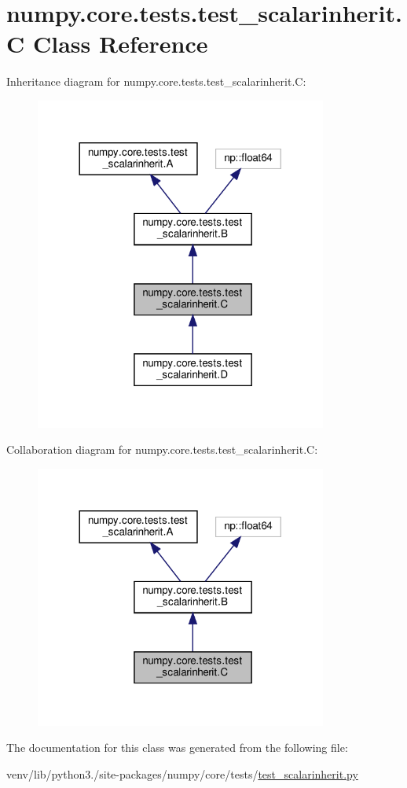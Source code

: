 \hypertarget{classnumpy_1_1core_1_1tests_1_1test__scalarinherit_1_1C}{}\section{numpy.\+core.\+tests.\+test\+\_\+scalarinherit.\+C Class Reference}
\label{classnumpy_1_1core_1_1tests_1_1test__scalarinherit_1_1C}


Inheritance diagram for numpy.\+core.\+tests.\+test\+\_\+scalarinherit.\+C\+:
\nopagebreak
\begin{figure}[H]
\begin{center}
\leavevmode
\includegraphics[width=272pt]{classnumpy_1_1core_1_1tests_1_1test__scalarinherit_1_1C__inherit__graph}
\end{center}
\end{figure}


Collaboration diagram for numpy.\+core.\+tests.\+test\+\_\+scalarinherit.\+C\+:
\nopagebreak
\begin{figure}[H]
\begin{center}
\leavevmode
\includegraphics[width=272pt]{classnumpy_1_1core_1_1tests_1_1test__scalarinherit_1_1C__coll__graph}
\end{center}
\end{figure}


The documentation for this class was generated from the following file\+:\begin{DoxyCompactItemize}
\item 
venv/lib/python3./site-\/packages/numpy/core/tests/\hyperlink{test__scalarinherit_8py}{test\+\_\+scalarinherit.\+py}\end{DoxyCompactItemize}
